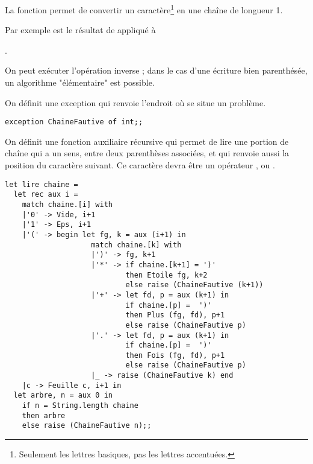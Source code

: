 La fonction  permet de convertir un caractère\footnote{Seulement les lettres basiques, pas les lettres accentuées.} en une chaîne de longueur 1. 
\medskip

Par exemple  est le résultat de  appliqué à

.

\medskip

On peut exécuter l'opération inverse ; dans le cas d'une écriture bien parenthésée, un algorithme "élémentaire" est possible.

On définit une exception qui renvoie l'endroit où se situe un problème.
\begin{lstlisting}
exception ChaineFautive of int;;               
\end{lstlisting}

On définit une fonction auxiliaire récursive qui permet de lire une portion de chaîne qui a un sens, entre deux parenthèses associées, et qui renvoie aussi la position du caractère suivant. Ce caractère devra être un opérateur ,  ou . 

\newpage
\begin{lstlisting}
let lire chaine =
  let rec aux i =
    match chaine.[i] with
    |'0' -> Vide, i+1 
    |'1' -> Eps, i+1 
    |'(' -> begin let fg, k = aux (i+1) in
                    match chaine.[k] with
                    |')' -> fg, k+1
                    |'*' -> if chaine.[k+1] = ')'
                            then Etoile fg, k+2
                            else raise (ChaineFautive (k+1))
                    |'+' -> let fd, p = aux (k+1) in
                            if chaine.[p] =  ')'
                            then Plus (fg, fd), p+1
                            else raise (ChaineFautive p)
                    |'.' -> let fd, p = aux (k+1) in
                            if chaine.[p] =  ')'
                            then Fois (fg, fd), p+1
                            else raise (ChaineFautive p)
                    |_ -> raise (ChaineFautive k) end
    |c -> Feuille c, i+1 in
  let arbre, n = aux 0 in
    if n = String.length chaine 
    then arbre 
    else raise (ChaineFautive n);;
\end{lstlisting}

